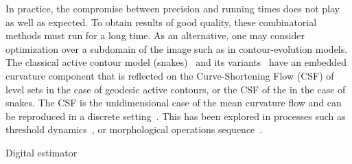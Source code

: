\documentclass[review]{siamart220329}
\begin{document}
In practice, the compromise between precision and running times does
not play as well as expected. To obtain results of good quality, these
combinatorial methods must run for a long time. As an alternative, one
may consider optimization over a subdomain of the image such as in
contour-evolution models. The classical active contour model
(snakes)~\cite{kass1988snakes} and its
variants~\cite{caseles97geodesic,chan01} have an embedded curvature
component that is reflected on the Curve-Shortening Flow (CSF) of
level sets in the case of geodesic active contours, or the CSF of the
 in the case of snakes. The CSF is the
unidimensional case of the mean curvature flow and can be reproduced
in a discrete setting~\cite{merriman1992diffusion}. This has been
explored in processes such as threshold
dynamics~\cite{esedoglu2005threshold,esedoglu2008threshold}, or
morphological operations sequence~\cite{marquezneila14}.

Digital estimator 
%
%
%
%
\end{document}
